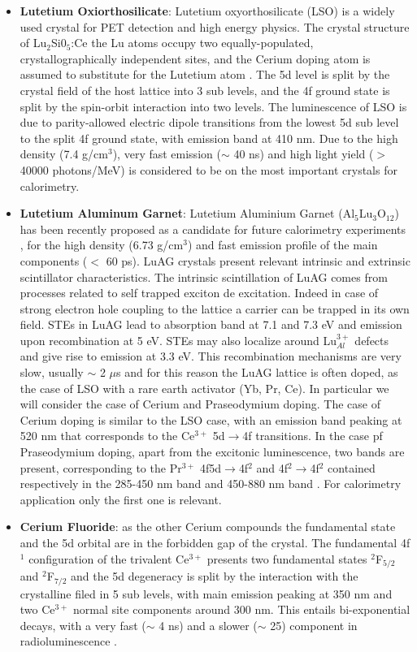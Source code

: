 \begin{itemize}
\item \textbf{Lutetium Oxiorthosilicate}: Lutetium oxyorthosilicate (LSO) is a widely used crystal for PET detection and high energy physics. The crystal structure of Lu$_{2}$Si0$_{5}$:Ce the Lu atoms occupy two equally-populated, crystallographically independent sites, and the Cerium doping atom is assumed to substitute for the Lutetium atom \cite{Naud1996}.
The 5d level is split by the crystal field of the host lattice into 3 sub levels, and the 4f ground state is split by the spin-orbit interaction into two levels.
The luminescence of LSO is due to parity-allowed electric dipole transitions from the lowest 5d sub level to the split 4f ground state, with emission band at 410 nm.
Due to the high density (7.4 g/cm$^{3}$), very fast emission ($\sim$ 40 ns) and high light yield ($>$40000 photons/MeV) is considered to be on the most important crystals for calorimetry.
\item \textbf{Lutetium Aluminum Garnet}: Lutetium Aluminium Garnet (Al$_{5}$Lu$_{3}$O$_{12}$) has been recently proposed as a candidate for future calorimetry experiments \cite{Kris2013}, for the high density (6.73 g/cm$^{3}$) and fast emission profile of the main components ($<$ 60 ps).
LuAG crystals present relevant intrinsic and extrinsic scintillator characteristics.
The intrinsic scintillation of LuAG comes from processes related to self trapped exciton de excitation. Indeed in case of strong electron hole coupling to the lattice a carrier can be trapped in its own field.
STEs in LuAG lead to absorption band at 7.1 and 7.3 eV and emission upon recombination at 5 eV.
STEs may also localize around Lu$_{Al}^{3+}$ defects and give rise to emission at 3.3 eV.
This recombination mechanisms are very slow, usually $\sim$ 2 $\mu$s and for this reason the LuAG lattice is often doped, as the case of LSO with a rare earth activator (Yb, Pr, Ce).
In particular we will consider the case of Cerium and Praseodymium doping.
The case of Cerium doping is similar to the LSO case, with an emission band peaking at 520 nm that corresponds to the Ce$^{3+}$ 5d$\rightarrow$4f transitions.
In the case pf Praseodymium doping, apart from the excitonic luminescence, two bands are present, corresponding to the Pr$^{3+}$ 4f5d$\rightarrow$4f$^{2}$ and 4f$^{2}\rightarrow$4f$^{2}$ contained respectively in the 285-450 nm band and 450-880 nm band \cite{Drozdowski2008}. For calorimetry application only the first one is relevant. 
\item \textbf{Cerium Fluoride}: as the other Cerium compounds the fundamental state and the 5d orbital are in the forbidden gap of the crystal. The fundamental 4f$^{1}$ configuration of the trivalent Ce$^{3+}$ presents two fundamental states $^{2}$F$_{5/2}$ and $^{2}$F$_{7/2}$ and the 5d degeneracy is split by the interaction with the crystalline filed in 5 sub levels, with main emission peaking at 350 nm and two Ce$^{3+}$ normal site components around 300 nm. This entails bi-exponential decays, with a very fast ($\sim$ 4 ns) and a slower ($\sim$ 25) component in radioluminescence \cite{Ferrere1993}.

\end{itemize}

